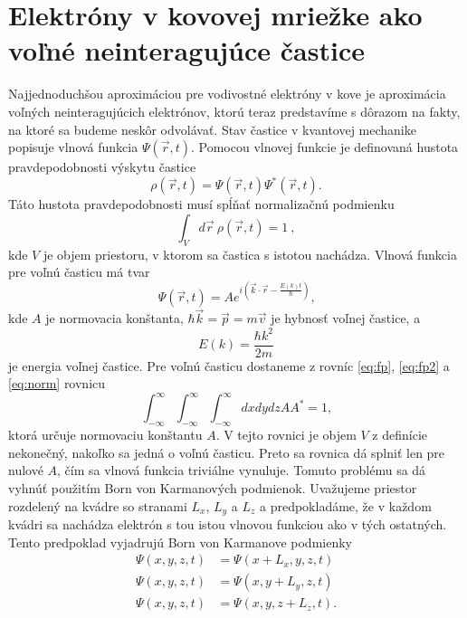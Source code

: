\section{Elektróny v kovovej mriežke ako voľné neinteragujúce častice}
\label{sec:free_electrons}
Najjednoduchšou aproximáciou pre vodivostné elektróny v kove je aproximácia voľných neinteragujúcich elektrónov, ktorú teraz predstavíme
s dôrazom na fakty, na ktoré sa budeme neskôr odvolávať.
Stav častice v kvantovej mechanike popisuje vlnová funkcia $\Psi(\vec r,t)$. 
Pomocou vlnovej funkcie je definovaná hustota pravdepodobnosti výskytu častice
\begin{equation}
\label{eq:fp2}
 \rho(\vec r, t)=\Psi(\vec r, t)\Psi^\ast(\vec r, t)\text{.}
\end{equation}
Táto hustota pravdepodobnosti musí spĺňať normalizačnú podmienku
\begin{equation}
\label{eq:norm}
 \int_{V} d \vec r  \  \rho(\vec r,t) = 1 \ ,
\end{equation}
kde $V$ je objem priestoru, v ktorom sa častica s istotou nachádza.
Vlnová funkcia pre voľnú časticu má tvar
\begin{equation}
\label{eq:fp}
 \Psi(\vec r,t)=Ae^{i(\vec k\cdot\vec r-\frac{E(k)t}{\hbar})} \text{,}
\end{equation}
kde $A$ je normovacia konštanta, $\hbar \vec k= \vec p = m \vec v$ je hybnosť voľnej častice, a
\begin{equation}
 \label{eq:fp_erg}
 E(k)=\frac{\hbar k^2}{2 m} \text{}
\end{equation}
je energia voľnej častice. Pre voľnú časticu dostaneme z rovníc \eqref{eq:fp}, \eqref{eq:fp2} a \eqref{eq:norm} rovnicu 
\begin{equation}
 \label{eq:norm_fp}
 \int_{-\infty}^\infty  \int_{-\infty}^\infty  \int_{-\infty}^\infty dx dy dz  AA^\ast = 1\text{,}
\end{equation}
ktorá určuje normovaciu konštantu $A$.
V tejto rovnici je objem $V$ z definície nekonečný, nakoľko sa jedná o voľnú časticu. Preto sa rovnica dá splniť len pre nulové $A$,
čím sa vlnová funkcia triviálne vynuluje. Tomuto problému sa dá vyhnúť použitím Born von Karmanových podmienok. 
Uvažujeme priestor rozdelený na kvádre so stranami $L_x$, $L_y$ a $L_z$ a predpokladáme, že v každom kvádri sa nachádza elektrón s tou istou vlnovou funkciou ako v tých ostatných. Tento predpoklad
vyjadrujú Born von Karmanove podmienky
\begin{align*}
 \Psi(x,y,z,t)&=\Psi(x+L_x,y,z,t)\\
 \Psi(x,y,z,t)&=\Psi(x,y+L_y,z,t)\\
 \Psi(x,y,z,t)&=\Psi(x,y,z+L_z,t)\text{.}
\end{align*}
